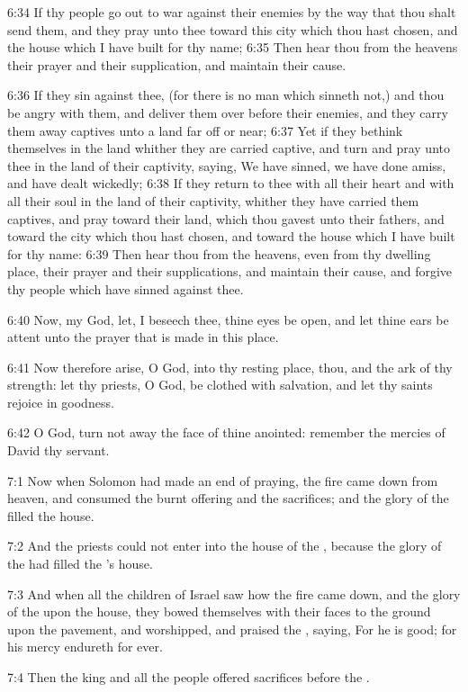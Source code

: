 6:34 If thy people go out to war against their enemies by the way that
thou shalt send them, and they pray unto thee toward this city which
thou hast chosen, and the house which I have built for thy name; 6:35
Then hear thou from the heavens their prayer and their supplication,
and maintain their cause.

6:36 If they sin against thee, (for there is no man which sinneth
not,) and thou be angry with them, and deliver them over before their
enemies, and they carry them away captives unto a land far off or
near; 6:37 Yet if they bethink themselves in the land whither they are
carried captive, and turn and pray unto thee in the land of their
captivity, saying, We have sinned, we have done amiss, and have dealt
wickedly; 6:38 If they return to thee with all their heart and with
all their soul in the land of their captivity, whither they have
carried them captives, and pray toward their land, which thou gavest
unto their fathers, and toward the city which thou hast chosen, and
toward the house which I have built for thy name: 6:39 Then hear thou
from the heavens, even from thy dwelling place, their prayer and their
supplications, and maintain their cause, and forgive thy people which
have sinned against thee.

6:40 Now, my God, let, I beseech thee, thine eyes be open, and let
thine ears be attent unto the prayer that is made in this place.

6:41 Now therefore arise, O \LORD God, into thy resting place, thou,
and the ark of thy strength: let thy priests, O \LORD God, be clothed
with salvation, and let thy saints rejoice in goodness.

6:42 O \LORD God, turn not away the face of thine anointed: remember
the mercies of David thy servant.

7:1 Now when Solomon had made an end of praying, the fire came down
from heaven, and consumed the burnt offering and the sacrifices; and
the glory of the \LORD filled the house.

7:2 And the priests could not enter into the house of the \LORD,
because the glory of the \LORD had filled the \LORD's house.

7:3 And when all the children of Israel saw how the fire came down,
and the glory of the \LORD upon the house, they bowed themselves with
their faces to the ground upon the pavement, and worshipped, and
praised the \LORD, saying, For he is good; for his mercy endureth for
ever.

7:4 Then the king and all the people offered sacrifices before the
\LORD.

